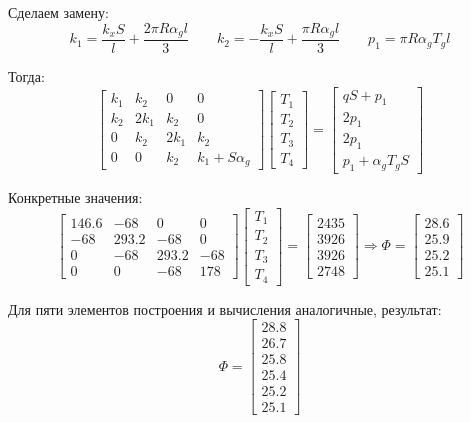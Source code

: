 \documentclass[a4paper, 12pt]{article}
\begin{document}
	Сделаем замену: 
	\[
	k_1=	\dfrac{k_xS}{l}+\dfrac{2\pi R \alpha_g l}{3} \qquad k_2= 	-\dfrac{k_xS}{l}+\dfrac{\pi R \alpha_g l}{3} \qquad p_1=\pi R \alpha_g T_g l
	\]
	
	Тогда:
	\[
	\begin{bmatrix}
		k_1&k_2&0&0 \\ k_2&2k_1&k_2&0\\ 0&k_2&2k_1&k_2\\ 0 & 0 & k_2  & k_1+S\alpha_g
	\end{bmatrix}\begin{bmatrix}
	T_1\\T_2\\T_3\\T_4
	\end{bmatrix}=\begin{bmatrix}
	qS+p_1\\2p_1\\2p_1\\p_1+\alpha_g T_g S
	\end{bmatrix}
	\]
	
	Конкретные значения:
	\[
	\begin{bmatrix}
		146.6&-68&0&0 \\ -68&293.2&-68&0\\ 0&-68&293.2&-68\\ 0 & 0 & -68  & 178
	\end{bmatrix}\begin{bmatrix}
		T_1\\T_2\\T_3\\T_4
	\end{bmatrix}=\begin{bmatrix}
		2435\\3926\\3926\\2748
	\end{bmatrix} \Rightarrow \Phi = \begin{bmatrix}
	28.6 \\ 25.9 \\25.2 \\25.1
	\end{bmatrix}
	\]
	
	Для пяти элементов построения и вычисления аналогичные, результат:
	\[
	\Phi = \begin{bmatrix}
		28.8 \\ 26.7 \\25.8 \\25.4 \\25.2\\25.1
	\end{bmatrix}
	\]
	
\end{document}
